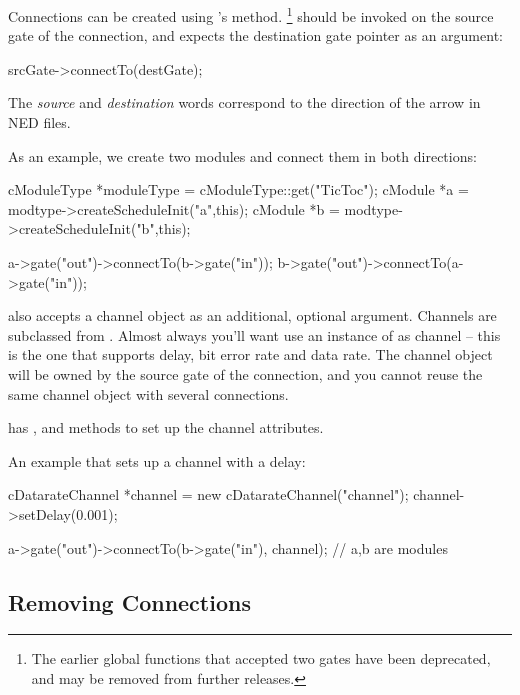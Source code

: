Connections can be created using 's 
method.
  \footnote{The earlier  global functions that
  accepted two gates have been deprecated, and may be removed
  from further {\opp} releases.}
 should be invoked on the source gate
of the connection, and expects the destination gate pointer as
an argument:

\begin{cpp}
srcGate->connectTo(destGate);
\end{cpp}

The \textit{source} and \textit{destination} words correspond
to the direction of the arrow in NED files.

As an example, we create two modules and connect them in both directions:

\begin{cpp}
cModuleType *moduleType = cModuleType::get("TicToc");
cModule *a = modtype->createScheduleInit("a",this);
cModule *b = modtype->createScheduleInit("b",this);

a->gate("out")->connectTo(b->gate("in"));
b->gate("out")->connectTo(a->gate("in"));
\end{cpp}

 also accepts a channel object as an
additional, optional argument. Channels are subclassed from
. Almost always you'll want use an instance of
 as channel -- this is the one that supports
delay, bit error rate 
and data rate. The channel object will
be owned by the source gate of the connection, and you cannot
reuse the same channel object with several connections.

 has , 
and  methods to set up the channel attributes.

An example that sets up a channel with a delay:

\begin{cpp}
cDatarateChannel *channel = new cDatarateChannel("channel");
channel->setDelay(0.001);

a->gate("out")->connectTo(b->gate("in"), channel); // a,b are modules
\end{cpp}


\subsection{Removing Connections}

